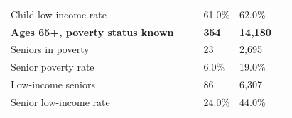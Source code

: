 \documentclass[9pt]{report}
\begin{document}
\begin{tabular}{p{.10in}p{.10in}p{.10in}p{3.7in}>{\hfill}p{.85in}>{\hfill}p{.85in}>{\hfill}p{.85in}>{\hfill}p{.85in}p{0.1in}}
\multicolumn{4}{l}{\parbox{3.6in}{\strut\raggedright{{Child low-income rate}}\strut}} &  &  & 61.0\% & 62.0\% & \multicolumn{1}{l}{}  \\ 
\multicolumn{4}{l}{\parbox{3.5in}{\strut\raggedright{\textbf{Ages 65+, poverty status known}\strut}}} & \textbf{} & \textbf{} & \textbf{354} & \textbf{14,180} & \textbf{} \\ 
\multicolumn{4}{l}{\parbox{3.6in}{\strut\raggedright{{Seniors in poverty}}\strut}} &  &  & 23 & 2,695 & \multicolumn{1}{l}{}  \\ 
\multicolumn{4}{l}{\parbox{3.6in}{\strut\raggedright{{Senior poverty rate}}\strut}} &  &  & 6.0\% & 19.0\% & \multicolumn{1}{l}{}  \\ 
\multicolumn{4}{l}{\parbox{3.6in}{\strut\raggedright{{Low-income seniors}}\strut}} &  &  & 86 & 6,307 & \multicolumn{1}{l}{}  \\ 
\multicolumn{4}{l}{\parbox{3.6in}{\strut\raggedright{{Senior low-income rate}}\strut}} &  &  & 24.0\% & 44.0\% & \multicolumn{1}{l}{}  \\ 

\end{tabular}
\setlength{\tabcolsep}{6pt} %
\end{document}
